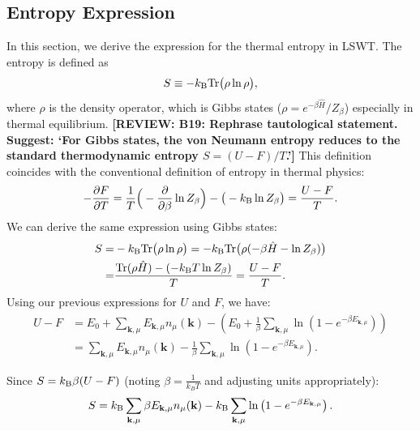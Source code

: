 \documentclass[aps, prx, nofootinbib, superscriptaddress]{revtex4-2}
\newcommand{\REVIEW}[1]{{\color{reviewcolor}\bfseries [REVIEW: #1]}}
\newcommand{\kvec}{\mathbf{k}}
\newcommand{\Tr}{\mathrm{Tr}}
\begin{document}
\subsection{Entropy Expression}\label{subsec: Entropy}
In this section, we derive the expression for the thermal entropy in LSWT. 
The entropy is defined as 
\begin{equation}
    S \equiv -k_{\rm B}\Tr \big( \rho \ln \rho \big),
\end{equation}
where $\rho$ is the density operator, which is Gibbs states ($\rho = e^{-\beta \hat{H}}/Z_{\beta}$) especially in thermal equilibrium.
\REVIEW{B19: Rephrase tautological statement. Suggest: `For Gibbs states, the von Neumann entropy reduces to the standard thermodynamic entropy $S=(U-F)/T$.'}
This definition coincides with the conventional definition of entropy in thermal physics:
\begin{align}
    - \frac{\partial F}{\partial T}
    = \frac{1}{T} \Big(-\frac{\partial}{\partial \beta} \ln Z_{\beta} \Big) - \big(-k_{\rm B} \ln Z_{\beta} \big)
    = \frac{U - F}{T}.
\end{align}
We can derive the same expression using Gibbs states:
\begin{align}
    S = & -k_{\rm B}\Tr \big( \rho \ln \rho \big)
    = -k_{\rm B}\Tr \big( \rho (-\beta \hat{H} - \ln Z_{\beta}) \big) \nonumber \\
    = &  \frac{ \Tr (\rho \hat{H}) - (-k_{\rm B}T\ln Z_{\beta})}{T} 
    = \frac{U - F}{T}.
\end{align}
Using our previous expressions for $U$ and $F$, we have:
\begin{align}
    U - F &= E_0 + \sum_{\kvec, \mu} E_{\kvec, \mu} n_{\mu}(\kvec) - \left( E_0 + \frac{1}{\beta} \sum_{\kvec, \mu} \ln \left( 1 - e^{-\beta E_{\kvec, \mu}} \right) \right) \nonumber \\ 
    &= \sum_{\kvec, \mu} E_{\kvec, \mu} n_{\mu}(\kvec) - \frac{1}{\beta} \sum_{\kvec, \mu} \ln \left( 1 - e^{-\beta E_{\kvec, \mu}} \right).
\end{align}

Since $S = k_{\rm B} \beta (U - F)$ (noting $\beta = \frac{1}{k_B T}$ and adjusting units appropriately):
\begin{equation}
    S = k_{\rm B} \sum_{\kvec, \mu} \beta E_{\kvec, \mu} n_{\mu} (\kvec) - k_{\rm B} \sum_{\kvec, \mu} \ln \left( 1 - e^{-\beta E_{\kvec, \mu}} \right).
\end{equation}
\end{document}
